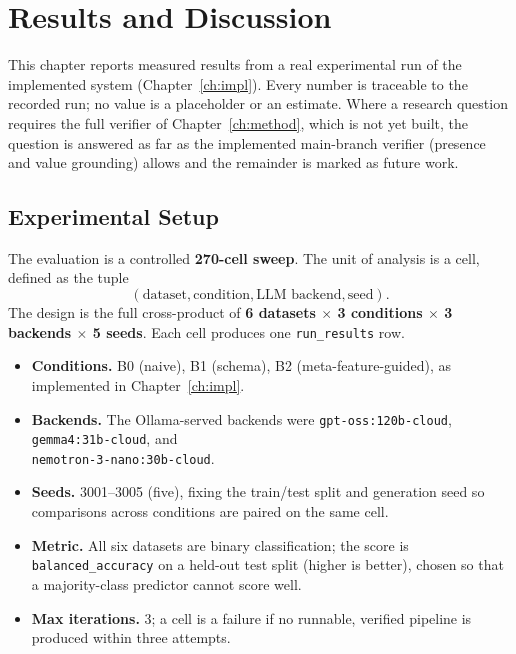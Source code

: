 \chapter{Results and Discussion}
\label{ch:results}

This chapter reports measured results from a real experimental run of
the implemented system (Chapter~\ref{ch:impl}). Every number is
traceable to the recorded run; no value is a placeholder or an
estimate. Where a research question requires the full verifier of
Chapter~\ref{ch:method}, which is not yet built, the question is
answered as far as the implemented main-branch verifier (presence and
value grounding) allows and the remainder is marked as future work.

\section{Experimental Setup}

The evaluation is a controlled \textbf{270-cell sweep}. The unit of
analysis is a cell, defined as the tuple
\[
(\text{dataset}, \text{condition}, \text{LLM backend}, \text{seed}).
\]
The design is the full cross-product of \textbf{6 datasets
$\times$ 3 conditions $\times$ 3 backends $\times$ 5 seeds}. Each cell
produces one \texttt{run\_results} row.

\begin{itemize}
    \item \textbf{Conditions.} B0 (naive), B1 (schema), B2
    (meta-feature-guided), as implemented in
    Chapter~\ref{ch:impl}.
    \item \textbf{Backends.} The Ollama-served backends were
    \texttt{gpt-oss:120b-cloud},\\
    \texttt{gemma4:31b-cloud}, and\\
    \texttt{nemotron-3-nano:30b-cloud}.
    \item \textbf{Seeds.} 3001--3005 (five), fixing the train/test
    split and generation seed so comparisons across conditions are
    paired on the same cell.
    \item \textbf{Metric.} All six datasets are binary
    classification; the score is \texttt{balanced\_accuracy} on a
    held-out test split (higher is better), chosen so that a
    majority-class predictor cannot score well.
    \item \textbf{Max iterations.} 3; a cell is a failure if no
    runnable, verified pipeline is produced within three attempts.
\end{itemize}

